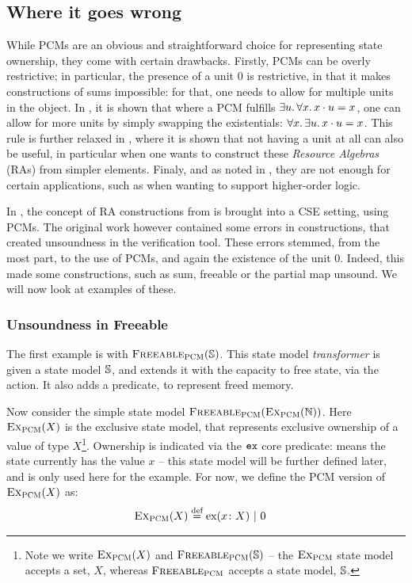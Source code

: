 \subsection{Where it goes wrong}

While PCMs are an obvious and straightforward choice for representing state ownership, they come with certain drawbacks. Firstly, PCMs can be overly restrictive; in particular, the presence of a unit $0$ is restrictive, in that it makes constructions of sums impossible: for that, one needs to allow for multiple units in the object. In \cite{sepalgebra}, it is shown that where a PCM fulfills $\exists u\ldotp \forall x\ldotp x\cdot u = x$, one can allow for more units by simply swapping the existentials: $\forall x\ldotp \exists u\ldotp x \cdot u = x$. This rule is further relaxed in \cite{iris}, where it is shown that not having a unit at all can also be useful, in particular when one wants to construct these \emph{Resource Algebras} (RAs) from simpler elements. Finaly, and as noted in \cite{iris}, they are not enough for certain applications, such as when wanting to support higher-order logic.

In \cite{sacha-phd}, the concept of RA constructions from \cite{iris} is brought into a CSE setting, using PCMs. The original work however contained some errors in constructions, that created unsoundness in the verification tool. These errors stemmed, from the most part, to the use of PCMs, and again the existence of the unit $0$. Indeed, this made some constructions, such as sum, freeable or the partial map unsound. We will now look at examples of these.

\subsubsection{Unsoundness in Freeable}

The first example is with $\textsc{Freeable}_{\textsc{PCM}}(\mathbb S)$. This state model \emph{transformer} is given a state model $\mathbb S$, and extends it with the capacity to free state, via the \free{} action. It also adds a \freedP{} predicate, to represent freed memory.

Now consider the simple state model $\textsc{Freeable}_{\textsc{PCM}}(\textsc{Ex}_{\textsc{PCM}}(\mathbb N))$. Here $\textsc{Ex}_{\textsc{PCM}}(X)$ is the exclusive state model, that represents exclusive ownership of a value of type $X$\footnote{Note we write $\textsc{Ex}_{\textsc{PCM}}(X)$ and $\textsc{Freeable}_{\textsc{PCM}}(\mathbb S)$ -- the $\textsc{Ex}_{\textsc{PCM}}$ state model accepts a set, $X$, whereas $\textsc{Freeable}_{\textsc{PCM}}$ accepts a state model, $\mathbb S$.}. Ownership is indicated via the $\texttt{ex}$ core predicate:  means the state currently has the value $x$ -- this state model will be further defined later, and is only used here for the example. For now, we define the PCM version of $\textsc{Ex}_{\textsc{PCM}}(X)$ as:
\begin{align*}
	\textsc{Ex}_{\textsc{PCM}}(X) &\stackrel{\textnormal{def}}= \text{ex}(x\colon X) ~|~ 0
\end{align*}

